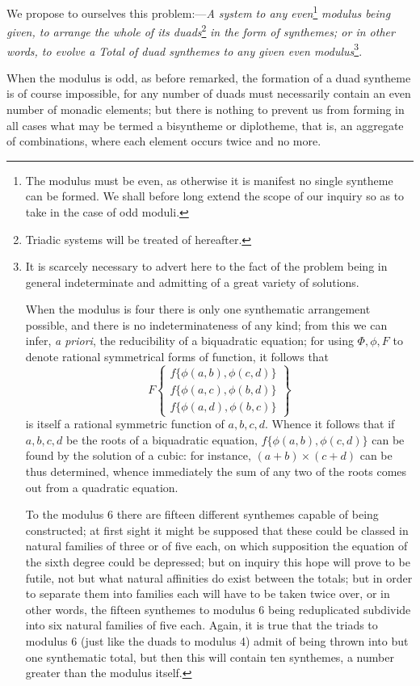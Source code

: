 \documentclass[11pt]{article}
\begin{document}
We propose to ourselves this problem:---\emph{A system to any even}\footnote{The modulus must be even, as otherwise it is manifest no single syntheme can be formed. We shall before long extend the scope of our inquiry so as to take in the case of odd moduli.} \emph{modulus being given, to arrange the whole of its duads}\footnote{Triadic systems will be treated of hereafter.} \emph{in the form of synthemes; or in other words, to evolve a Total of duad synthemes to any given even modulus}\footnote{It is scarcely necessary to advert here to the fact of the problem being in general indeterminate and admitting of a great variety of solutions.

When the modulus is four there is only one synthematic arrangement possible, and there is no indeterminateness of any kind; from this we can infer, \emph{a priori}, the reducibility of a biquadratic equation; for using $\Phi,\phi,F$ to denote rational symmetrical forms of function, it follows that
\[
F\left\{\begin{array}{l}
f\{\phi(a,b),\phi(c,d)\}\\
f\{\phi(a,c),\phi(b,d)\}\\
f\{\phi(a,d),\phi(b,c)\}
\end{array}\right\}
\]
is itself a rational symmetric function of $a,b,c,d$.
Whence it follows that if $a,b,c,d$ be the roots of a biquadratic equation, $f\{\phi(a,b),\phi(c,d)\}$ can be found by the solution of a cubic: for instance, $(a+b)\times(c+d)$ can be thus determined, whence immediately the sum of any two of the roots comes out from a quadratic equation.

To the modulus 6 there are fifteen different synthemes capable of being constructed; at first sight it might be supposed that these could be classed in natural families of three or of five each, on which supposition the equation of the sixth degree could be depressed; but on inquiry this hope will prove to be futile, not but what natural affinities do exist between the totals; but in order to separate them into families each will have to be taken twice over, or in other words, the fifteen synthemes to modulus 6 being reduplicated subdivide into six natural families of five each. Again, it is true that the triads to modulus 6 (just like the duads to modulus 4) admit of being thrown into but one synthematic total, but then this will contain ten synthemes, a number greater than the modulus itself.}.

When the modulus is odd, as before remarked, the formation of a duad syntheme is of course impossible, for any number of duads must necessarily contain an even number of monadic elements; but there is nothing to prevent us from forming in all cases what may be termed a bisyntheme or diplotheme, that is, an aggregate of combinations, where each element occurs twice and no more.
\end{document}
